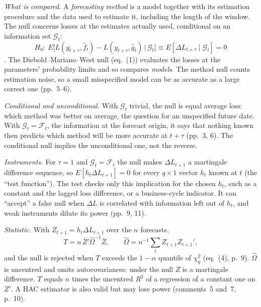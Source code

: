 \begin{qfmethod}\label{meth:conditional-predictive-ability}
 \emph{What is compared.} A \emph{forecasting method} is a model together with its estimation procedure and the data used to estimate it, including the length of the window. The null concerns losses at the estimates actually used, conditional on an information set $\mathcal G_t$:
\[ H_0:\ E\bigl[L(y_{t+\tau},\hat f_t)-L(y_{t+\tau},\hat g_t)\,\big|\,\mathcal G_t\bigr]\equiv E[\Delta L_{t+\tau}\mid\mathcal G_t]=0 \]
\citep[authors' version, April 2006, eqs.~(2)--(3), pp.~5, 8]{giacomini-white-2006-wp}. The Diebold--Mariano--West null (eq.~(1)) evaluates the losses at the parameters' probability limits and so compares \emph{models}. The method null counts estimation noise, so a small misspecified model can be as accurate as a large correct one (pp.~5--6).

\emph{Conditional and unconditional.} With $\mathcal G_t$ trivial, the null is equal average loss: which method was better on average, the question for an unspecified future date. With $\mathcal G_t=\mathcal F_t$, the information at the forecast origin, it says that nothing known then predicts which method will be more accurate at $t+\tau$ (pp.~3, 6). The conditional null implies the unconditional one, not the reverse.

\emph{Instruments.} For $\tau=1$ and $\mathcal G_t=\mathcal F_t$ the null makes $\Delta L_{t+1}$ a martingale difference sequence, so $E[h_t\Delta L_{t+1}]=0$ for every $q\times1$ vector $h_t$ known at $t$ (the ``test function''). The test checks only this implication for the chosen $h_t$, such as a constant and the lagged loss difference, or a business-cycle indicator. It can ``accept'' a false null when $\Delta L$ is correlated with information left out of $h_t$, and weak instruments dilute its power (pp.~9, 11).

\emph{Statistic.} With $Z_{t+1}=h_t\Delta L_{t+1}$ over the $n$ forecasts,
\[ T=n\,\bar Z'\hat\Omega^{-1}\bar Z,\qquad \hat\Omega=n^{-1}\textstyle\sum_t Z_{t+1}Z_{t+1}', \]
and the null is rejected when $T$ exceeds the $1-\alpha$ quantile of $\chi^2_q$ (eq.~(4), p.~9). $\hat\Omega$ is uncentred and omits autocovariances: under the null $Z$ is a martingale difference. $T$ equals $n$ times the uncentred $R^2$ of a regression of a constant one on $Z'$. A HAC estimator is also valid but may lose power (comments~5 and~7, p.~10).


\end{qfmethod}
